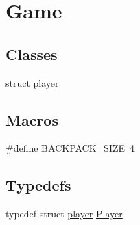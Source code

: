 \hypertarget{group__game}{}\section{Game}
\label{group__game}
\subsection*{Classes}
\begin{DoxyCompactItemize}
\item 
struct \hyperlink{structplayer}{player}
\end{DoxyCompactItemize}
\subsection*{Macros}
\begin{DoxyCompactItemize}
\item 
\#define \hyperlink{group__game_gac25e6ef3ae2779588d3e1fbced1e8ceb}{B\+A\+C\+K\+P\+A\+C\+K\+\_\+\+S\+I\+ZE}~4
\end{DoxyCompactItemize}
\subsection*{Typedefs}
\begin{DoxyCompactItemize}
\item 
typedef struct \hyperlink{structplayer}{player} \hyperlink{group__game_gac6f795d0d2e88ee469ddc704329e7cc3}{Player}
\end{DoxyCompactItemize}
